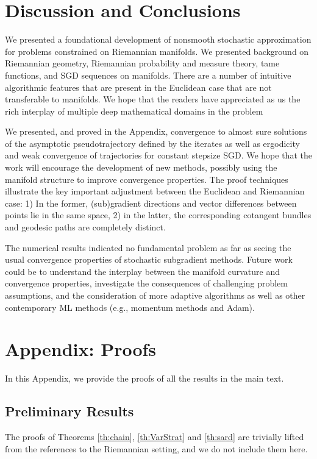 \documentclass{article}
\begin{document}
\section{Discussion and Conclusions}
We presented a foundational development of nonsmooth stochastic approximation for problems constrained on Riemannian manifolds. We presented background on Riemannian geometry, Riemannian probability and measure theory, tame functions, and SGD sequences on manifolds. There are a number of intuitive algorithmic features that are present in the Euclidean case that are not transferable to manifolds. We hope that the readers have appreciated as us the rich interplay of multiple deep mathematical domains in the problem

We presented, and proved in the Appendix, convergence to almost sure solutions of the asymptotic pseudotrajectory defined by the iterates as well as ergodicity and weak convergence of trajectories for constant stepsize SGD. We hope that the work will encourage the development of new methods, possibly using the manifold structure to improve convergence properties. The proof techniques illustrate the key important adjustment between the Euclidean and Riemannian case: 1) In the former, (sub)gradient directions and vector differences between points lie in the same space, 2) in the latter, the corresponding cotangent bundles and geodesic paths are completely distinct. 

The numerical results indicated no fundamental problem as far as seeing the usual convergence properties of stochastic subgradient methods. Future work could be to understand the interplay between the manifold curvature and convergence properties, investigate the consequences of challenging problem assumptions, and the consideration of more adaptive algorithms as well as other contemporary ML methods (e.g., momentum methods and Adam).





\section{Appendix: Proofs}
In this Appendix, we provide the proofs of all the results in the main text.

\subsection{Preliminary Results}\label{app:proof_prel}
The proofs of Theorems \ref{th:chain}, \ref{th:VarStrat} and \ref{th:sard} are trivially lifted from the references to the Riemannian setting, and we do not include them here. 
\end{document}

